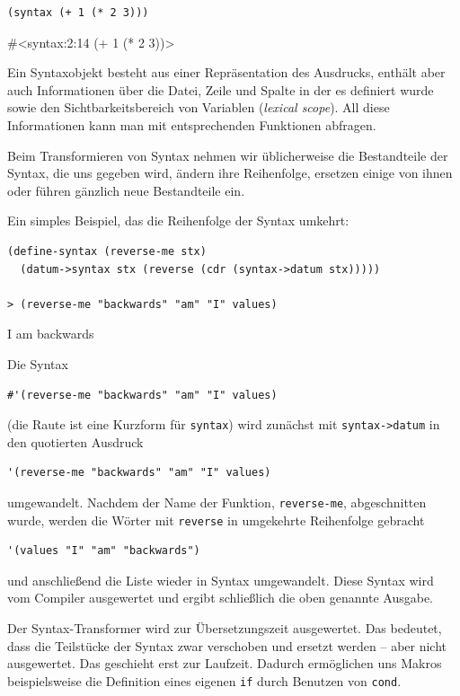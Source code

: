\begin{lstlisting}
(syntax (+ 1 (* 2 3)))
\end{lstlisting}
{\routput\#<syntax:2:14 (+ 1 (* 2 3))>}

Ein Syntaxobjekt besteht aus einer Repräsentation des Ausdrucks, enthält aber auch Informationen über die Datei, Zeile und Spalte in der es definiert wurde sowie den Sichtbarkeitsbereich von Variablen (\emph{lexical scope}). All diese Informationen kann man mit entsprechenden Funktionen abfragen.

Beim Transformieren von Syntax nehmen wir üblicherweise die Bestandteile der Syntax, die uns gegeben wird, ändern ihre Reihenfolge, ersetzen einige von ihnen oder führen gänzlich neue Bestandteile ein.

Ein simples Beispiel, das die Reihenfolge der Syntax umkehrt:

\begin{lstlisting}
(define-syntax (reverse-me stx)
  (datum->syntax stx (reverse (cdr (syntax->datum stx)))))
  
> (reverse-me "backwards" "am" "I" values)
\end{lstlisting}
{\routput {\qq}I{\qq} {\qq}am{\qq} {\qq}backwards{\qq}}

Die Syntax

\begin{lstlisting}
#'(reverse-me "backwards" "am" "I" values)
\end{lstlisting}

(die Raute ist eine Kurzform für \texttt{syntax}) wird zunächst mit \texttt{syntax->datum} in den quotierten Ausdruck 

\begin{lstlisting}
'(reverse-me "backwards" "am" "I" values)
\end{lstlisting}


umgewandelt. Nachdem der Name der Funktion, \texttt{reverse-me}, abgeschnitten wurde, werden die Wörter mit \texttt{reverse} in umgekehrte Reihenfolge gebracht

\begin{lstlisting}
'(values "I" "am" "backwards")
\end{lstlisting}

und anschließend die Liste wieder in Syntax umgewandelt. Diese Syntax wird vom Compiler ausgewertet und ergibt schließlich die oben genannte Ausgabe.


Der Syntax-Transformer wird zur Übersetzungszeit ausgewertet. Das bedeutet, dass die Teilstücke der Syntax zwar verschoben und ersetzt werden -- aber nicht ausgewertet. Das geschieht erst zur Laufzeit. Dadurch ermöglichen uns Makros beispielsweise die Definition eines eigenen \texttt{if} durch Benutzen von \texttt{cond}.

